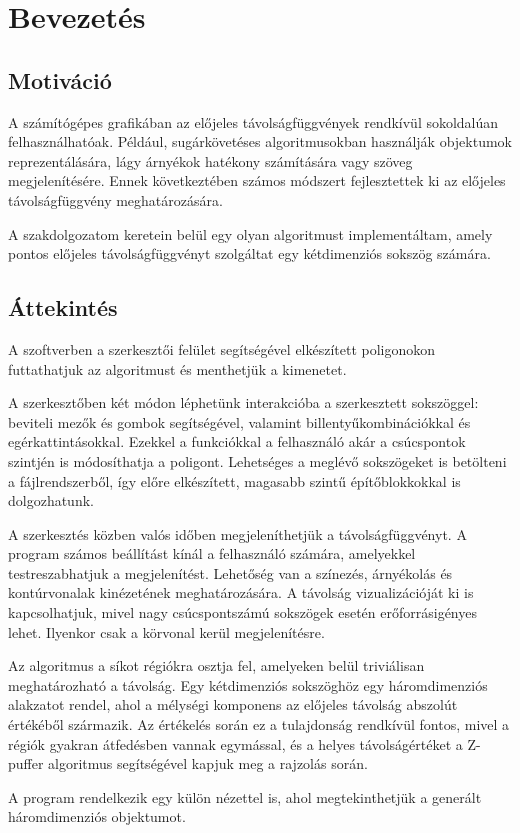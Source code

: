 \chapter{Bevezetés}
\label{ch:intro}

\section{Motiváció}\label{sec:motivacio}
A számítógépes grafikában az előjeles távolságfüggvények rendkívül sokoldalúan felhasználhatóak. Például, sugárkövetéses algoritmusokban használják objektumok reprezentálására, lágy árnyékok hatékony számítására vagy szöveg megjelenítésére. Ennek következtében számos módszert fejlesztettek ki az előjeles távolságfüggvény meghatározására.

A szakdolgozatom keretein belül egy olyan algoritmust implementáltam, amely pontos előjeles távolságfüggvényt szolgáltat egy kétdimenziós sokszög számára.

\section{Áttekintés}\label{sec:attekintes}
A szoftverben a szerkesztői felület segítségével elkészített poligonokon futtathatjuk az algoritmust és menthetjük a kimenetet.

A szerkesztőben két módon léphetünk interakcióba a szerkesztett sokszöggel: beviteli mezők és gombok segítségével, valamint billentyűkombinációkkal és egérkattintásokkal. Ezekkel a funkciókkal a felhasználó akár a csúcspontok szintjén is módosíthatja a poligont. Lehetséges a meglévő sokszögeket is betölteni a fájlrendszerből, így előre elkészített, magasabb szintű építőblokkokkal is dolgozhatunk.

A szerkesztés közben valós időben megjeleníthetjük a távolságfüggvényt. A program számos beállítást kínál a felhasználó számára, amelyekkel testreszabhatjuk a megjelenítést. Lehetőség van a színezés, árnyékolás és kontúrvonalak kinézetének meghatározására. A távolság vizualizációját ki is kapcsolhatjuk, mivel nagy csúcspontszámú sokszögek esetén erőforrásigényes lehet. Ilyenkor csak a körvonal kerül megjelenítésre.

Az algoritmus a síkot régiókra osztja fel, amelyeken belül triviálisan meghatározható a távolság. Egy kétdimenziós sokszöghöz egy háromdimenziós alakzatot rendel, ahol a mélységi komponens az előjeles távolság abszolút értékéből származik. Az értékelés során ez a tulajdonság rendkívül fontos, mivel a régiók gyakran átfedésben vannak egymással, és a helyes távolságértéket a Z-puffer algoritmus segítségével kapjuk meg a rajzolás során.

A program rendelkezik egy külön nézettel is, ahol megtekinthetjük a generált háromdimenziós objektumot.
